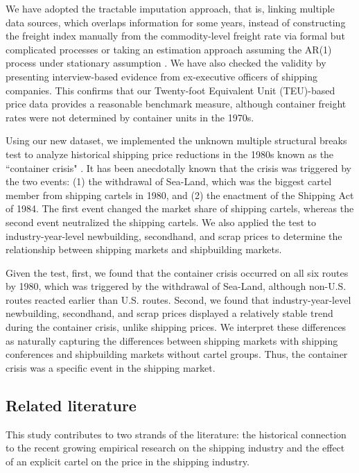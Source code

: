 \documentclass[11pt]{article}
\begin{document}
We have adopted the tractable imputation approach, that is, linking multiple data sources, which overlaps information for some years, instead of constructing the freight index manually from the commodity-level freight rate via formal but complicated processes or taking an estimation approach assuming the AR(1) process under stationary assumption \citep{jeon2022learning}. We have also checked the validity by presenting interview-based evidence from ex-executive officers of shipping companies. This confirms that our Twenty-foot Equivalent Unit (TEU)-based price data provides a reasonable benchmark measure, although container freight rates were not determined by container units in the 1970s.

Using our new dataset, we implemented the unknown multiple structural breaks test \citep{bai1998estimating,bai2003computation} to analyze historical shipping price reductions in the 1980s known as the ``container crisis" \citep{broeze2002globalisation}. It has been anecdotally known that the crisis was triggered by the two events: (1) the withdrawal of Sea-Land, which was the biggest cartel member from shipping cartels in 1980, and (2) the enactment of the Shipping Act of 1984. The first event changed the market share of shipping cartels, whereas the second event neutralized the shipping cartels. We also applied the test to industry-year-level newbuilding, secondhand, and scrap prices to determine the relationship between shipping markets and shipbuilding markets.

Given the test, first, we found that the container crisis occurred on all six routes by 1980, which was triggered by the withdrawal of Sea-Land, although non-U.S. routes reacted earlier than U.S. routes. Second, we found that industry-year-level newbuilding, secondhand, and scrap prices displayed a relatively stable trend during the container crisis, unlike shipping prices. We interpret these differences as naturally capturing the differences between shipping markets with shipping conferences and shipbuilding markets without cartel groups. Thus, the container crisis was a specific event in the shipping market.


\subsection{Related literature}\label{subsec:litereture}

This study contributes to two strands of the literature: the historical connection to the recent growing empirical research on the shipping industry and the effect of an explicit cartel on the price in the shipping industry.
\end{document}
